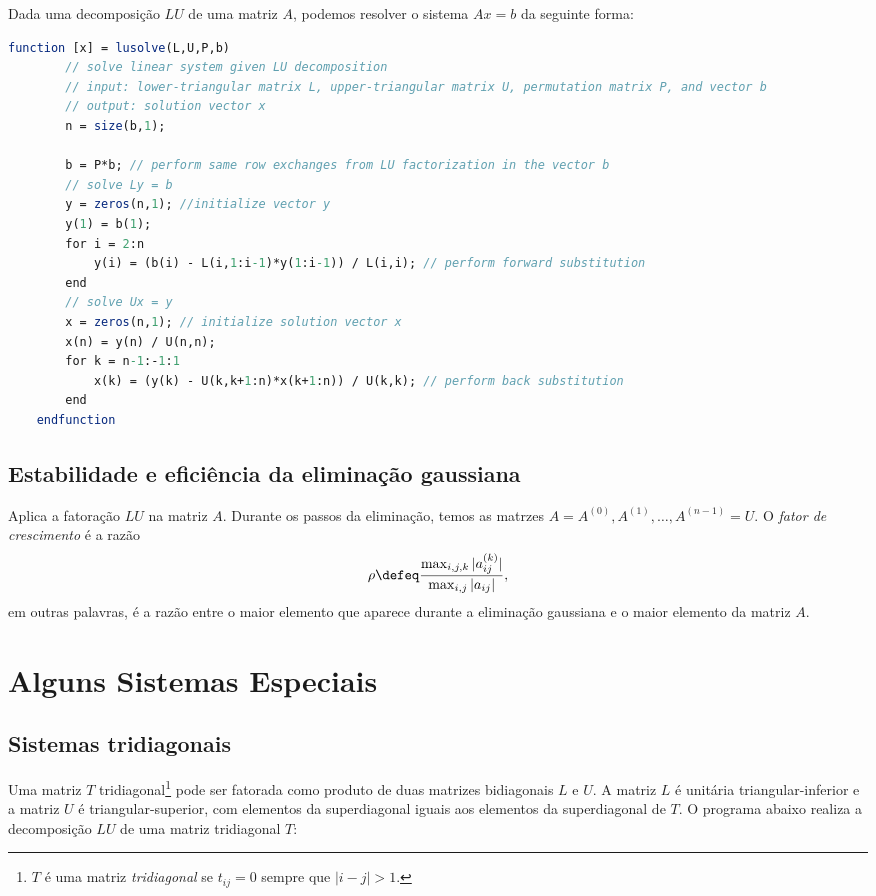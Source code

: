 \documentclass{article}
\begin{document}
Dada uma decomposição \(LU\) de uma matriz \(A\), podemos resolver o sistema \(Ax=b\) da seguinte forma:

\begin{lstlisting}[language=Scilab, caption=Resolução de sistema linear usando decomposição \(LU\)]
    function [x] = lusolve(L,U,P,b)
        // solve linear system given LU decomposition
        // input: lower-triangular matrix L, upper-triangular matrix U, permutation matrix P, and vector b
        // output: solution vector x
        n = size(b,1);
        
        b = P*b; // perform same row exchanges from LU factorization in the vector b
        // solve Ly = b
        y = zeros(n,1); //initialize vector y
        y(1) = b(1);
        for i = 2:n
            y(i) = (b(i) - L(i,1:i-1)*y(1:i-1)) / L(i,i); // perform forward substitution
        end
        // solve Ux = y
        x = zeros(n,1); // initialize solution vector x
        x(n) = y(n) / U(n,n);
        for k = n-1:-1:1
            x(k) = (y(k) - U(k,k+1:n)*x(k+1:n)) / U(k,k); // perform back substitution
        end
    endfunction
\end{lstlisting}

\subsection{Estabilidade e eficiência da eliminação gaussiana}

\begin{defn}
    Aplica a fatoração \(LU\) na matriz \(A\). Durante os passos da eliminação, temos as matrzes \(A = A^{(0)}, A^{(1)}, \ldots, A^{(n-1)} = U\). O \emph{fator de crescimento} é a razão
    \[
        \rho \defeq \frac{\max_{i,j,k} |a_{ij}^{(k)}|}{\max_{i,j} |a_{ij}|},
    \]
em outras palavras, é a razão entre o maior elemento que aparece durante a eliminação gaussiana e o maior elemento da matriz \(A\).
\end{defn}

\section{Alguns Sistemas Especiais}

\subsection{Sistemas tridiagonais}

Uma matriz \(T\) tridiagonal\footnote{\(T\) é uma matriz \emph{tridiagonal} se \(t_{ij} = 0\) sempre que \(|i-j| > 1\).} pode ser fatorada como produto de duas matrizes bidiagonais \(L\) e \(U\). A matriz \(L\) é unitária triangular-inferior e a matriz \(U\) é triangular-superior, com elementos da superdiagonal iguais aos elementos da superdiagonal de \(T\). O programa abaixo realiza a decomposição \(LU\) de uma matriz tridiagonal \(T\):
\end{document}

